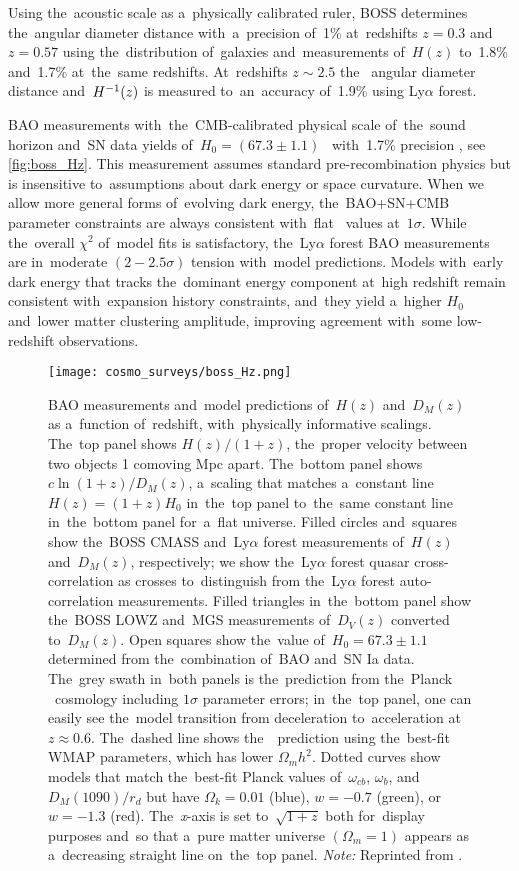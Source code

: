 Using the~acoustic scale as a~physically calibrated ruler, BOSS determines the~angular diameter distance with~a~precision of~1\% at~redshifts $z = 0.3$ and~$z = 0.57$ using the~distribution of~galaxies and~measurements of~$H(z)$ to~1.8\% and~1.7\%  at~the~same redshifts. At~redshifts $z\sim2.5$ the~ angular diameter distance and~$H^{-1}(z)$ is measured to~an~accuracy of~1.9\% using Ly$\alpha$ forest.

BAO measurements with~the~CMB-calibrated physical scale of~the~sound horizon and~SN data yields of~$H_0=(67.3\pm1.1)$ \unith\ with~1.7\% precision \cite{BOSS_results}, see \autoref{fig:boss_Hz}. This measurement assumes standard pre-recombination physics but is insensitive to~assumptions about dark energy or space curvature. When we allow more general forms of~evolving dark energy, the~BAO+SN+CMB parameter constraints are always consistent with~flat \LCDM\ values at~$1\sigma$. While the~overall $\chi^2$ of~model fits is satisfactory, the~Ly$\alpha$ forest BAO measurements are in~moderate $(2-2.5\sigma)$ tension with~model predictions. Models with~early dark energy that tracks the~dominant energy component at~high redshift remain consistent with~expansion history constraints, and~they yield a~higher $H_0$ and~lower matter clustering amplitude, improving agreement with~some low-redshift observations.
\begin{figure}[htbp]
    \centering
    \texttt{[image: cosmo\_surveys/boss\_Hz.png]}
    \caption{BAO measurements and~model predictions of~\(H(z)\) and~\(D_M(z)\) as a~function of~redshift, with~physically informative scalings. The~top panel shows \(H(z)/(1+z)\), the~proper velocity between two objects 1 comoving Mpc apart. The~bottom panel shows \(c\ln{(1+z)}/D_M(z)\), a~scaling that matches a~constant line \(H(z)=(1+z)H_0\) in~the~top panel to~the~same constant line in~the~bottom panel for~a~flat universe. Filled circles and~squares show the~BOSS CMASS and~Ly$\alpha$ forest measurements of~\(H(z)\) and~\(D_M(z)\), respectively; we show the~Ly$\alpha$ forest quasar cross-correlation as crosses to~distinguish from the~Ly$\alpha$ forest auto-correlation measurements. Filled triangles in~the~bottom panel show the~BOSS LOWZ and~MGS measurements of~\(D_V (z)\) converted to~\(D_M(z)\). Open squares show the~value of~\(H_0 = 67.3\pm1.1\) \unith determined from the~combination of~BAO and~SN Ia data. The~grey swath in~both panels is the~prediction from the~Planck \LCDM\ cosmology including \(1\sigma\) parameter errors; in~the~top panel, one can easily see the~model transition from deceleration to~acceleration at~\(z\approx0.6\). The~dashed line shows the~\LCDM\ prediction using the~best-fit WMAP parameters, which has lower \(\Omega_mh^2\). Dotted curves show models that match the~best-fit Planck values of~\(\omega_{cb}\), \(\omega_{b}\), and~\(D_M(1090)/r_d\) but have \(\Omega_k = 0.01\) (blue), \(w = -0.7\) (green), or \(w = -1.3\) (red). The~\textit{x}-axis is set to~\(\sqrt{1+z}\) both for~display purposes and~so that a~pure matter universe \((\Omega_m = 1)\) appears as a~decreasing straight line on~the~top panel. \textit{Note:} Reprinted from \textcite{BOSS_results}.}
    \label{fig:boss_Hz}
\end{figure}
